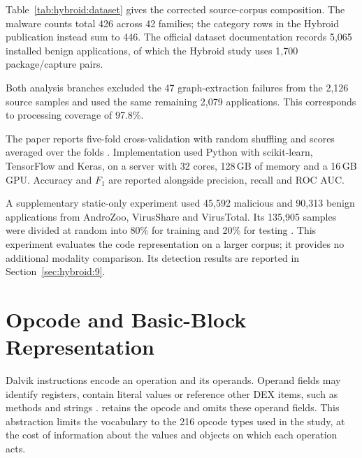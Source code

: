 Table~\ref{tab:hybroid:dataset} gives the corrected source-corpus composition. The malware
counts total 426 across 42 families; the category rows in the Hybroid publication instead sum
to 446. The official dataset documentation records 5,065 installed benign applications, of
which the Hybroid study uses 1,700 package/capture pairs.

Both analysis branches excluded the 47 graph-extraction failures from the 2,126 source samples
and used the same remaining 2,079 applications. This corresponds to processing coverage of
97.8\%.

The paper reports five-fold cross-validation with random shuffling and scores averaged over
the folds \cite{norouzian2021hybroid}. Implementation used Python with scikit-learn, TensorFlow
and Keras, on a server with 32 cores, 128\,GB of memory and a 16\,GB GPU. Accuracy and $F_1$
are reported alongside precision, recall and ROC AUC.

A supplementary static-only experiment used 45,592 malicious and 90,313 benign applications
from AndroZoo, VirusShare and VirusTotal. Its 135,905 samples were divided at random into
80\% for training and 20\% for testing \cite{norouzian2021hybroid}. This experiment
evaluates the code representation on a larger corpus; it provides no additional modality
comparison. Its detection results are reported in Section~\ref{sec:hybroid:9}.

\section{Opcode and Basic-Block Representation}
\label{sec:hybroid:5}

Dalvik instructions encode an operation and its operands. Operand fields may identify registers,
contain literal values or reference other DEX items, such as methods and strings
\cite{aosp2026dalvikbytecode}. \hybroid{} retains the opcode and omits these operand fields.
This abstraction limits the vocabulary to the 216 opcode types used in the study, at the cost
of information about the values and objects on which each operation acts.

